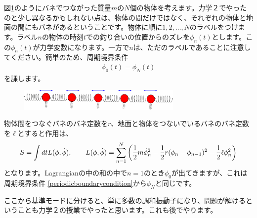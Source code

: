 \documentclass[report,paper=a4, fontsize=12pt, line_length=16cm, number_of_lines=33,dvipdfmx]{jlreq}
\numberwithin{equation}{chapter}
\begin{document}
図\ref{fig:oscillator}のようにバネでつながった質量$m$の$N$個の物体を考えます。力学２でやったのと少し異なるかもしれない点は、物体の間だけではなく、それぞれの物体と地面の間にもバネがあるということです。物体に順に$1,2,\dots,N$のラベルをつけます。ラベル$n$の物体の時刻$t$での釣り合いの位置からのズレを$\phi_n(t)$とします。この$\phi_n(t)$が力学変数になります。一方で$n$は、ただのラベルであることに注意してください。簡単のため、周期境界条件
\begin{align}
  \phi_{0}(t)=\phi_{N}(t)\label{periodicboundarycondition}
\end{align}
を課します。
\begin{figure}[htbp]
  \centering
  \includegraphics[width=8cm]{oscillator.pdf}
  \caption{}
  \label{fig:oscillator}
\end{figure}


物体間をつなぐバネのバネ定数を$r$、地面と物体をつないでいるバネのバネ定数を$\ell$とすると作用は、
\begin{align}
  S=\int dt L(\phi,\dot{\phi}),\qquad
  L(\phi,\dot{\phi})=\sum_{n=1}^{N}\qty(
    \frac12 m \dot{\phi}_n^2-\frac12 r (\phi_n-\phi_{n-1})^2
    -\frac12 \ell \phi_n^2
  )\label{oscillatorLagrangian}
\end{align}
となります。Lagrangianの中の和の中で$n=1$のとき$\phi_0$が出てきますが、これは周期境界条件
\eqref{periodicboundarycondition}から$\phi_N$と同じです。

ここから基準モードに分けると、単に多数の調和振動子になり、問題が解けるということも力学２の授業でやったと思います。これも後でやります。
\end{document}
